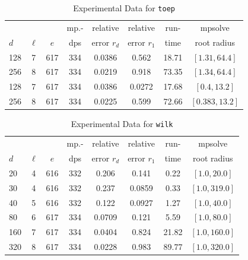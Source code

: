 \documentclass[runningheads]{llncs}
\begin{document}
\begin{table}
\caption{Experimental Data for \texttt{toep}} %
\label{tab:toep}
\vskip -0.15in
\begin{center}
\begin{small}
\begin{sc}
\begin{tabular}{lccccccc}
\toprule
&  &  & mp.-& relative  & relative & run- & mpsolve \\
$d$& $\ell$& $e$ & dps&error $r_d$       & error $r_1$ &time& root radius\\
\midrule
 128 & 7 & 617 & 334 & 0.0386 & 0.562 & 18.71 & $[1.31, 64.4]$\\
 256 & 8 & 617 & 334 & 0.0219 & 0.918 & 73.35 & $[1.34, 64.4]$\\
 128 & 7 & 617 & 334 & 0.0386 & 0.0272 & 17.68 & $[0.4, 13.2]$\\
 256 & 8 & 617 & 334 & 0.0225 & 0.599 & 72.66 & $[0.383, 13.2]$\\
\bottomrule
\end{tabular}
\end{sc}
\end{small}
\end{center}
\vskip 0.05in
\end{table}


\begin{table}
\caption{Experimental Data for \texttt{wilk}} %
\label{tab:wilk}
\vskip -0.15in
\begin{center}
\begin{small}
\begin{sc}
\begin{tabular}{lccccccc}
\toprule
&  &  & mp.-& relative  & relative & run- & mpsolve \\
$d$& $\ell$& $e$ & dps&error $r_d$       & error $r_1$ &time& root radius\\
\midrule
 20 & 4 & 616 & 332 & 0.206 & 0.141 & 0.22 & $[1.0, 20.0]$\\
 30 & 4 & 616 & 332 & 0.237 & 0.0859 & 0.33 & $[1.0, 319.0]$\\
 40 & 5 & 616 & 332 & 0.122 & 0.0927 & 1.27 & $[1.0, 40.0]$\\
 80 & 6 & 617 & 334 & 0.0709 & 0.121 & 5.59 & $[1.0, 80.0]$\\
 160 & 7 & 617 & 334 & 0.0404 & 0.824 & 21.82 & $[1.0, 160.0]$\\
 320 & 8 & 617 & 334 & 0.0228 & 0.983 & 89.77 & $[1.0, 320.0]$\\
\bottomrule
\end{tabular}
\end{sc}
\end{small}
\end{center}
\vskip 0.05in
\end{table}
\end{document}
